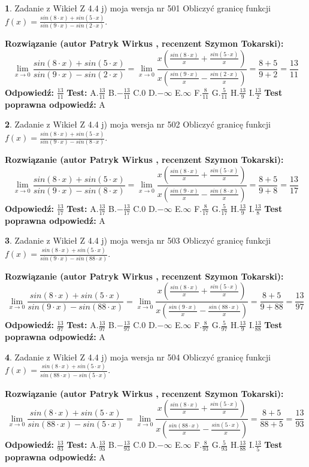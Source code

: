 \documentclass[12pt, a4paper]{article}
\theoremstyle{definition} %
\newtheorem{zad}{}
\newcommand{\zadStart}[1]{\begin{zad}#1\newline}
\newcommand{\zadStop}{\end{zad}}
\newcommand{\rozwStart}[2]{\noindent \textbf{Rozwiązanie (autor #1 , recenzent #2): }\newline}
\newcommand{\rozwStop}{\newline}
\newcommand{\odpStart}{\noindent \textbf{Odpowiedź:}\newline}
\newcommand{\odpStop}{\newline}
\newcommand{\testStart}{\noindent \textbf{Test:}\newline}
\newcommand{\testStop}{\newline}
\newcommand{\kluczStart}{\noindent \textbf{Test poprawna odpowiedź:}\newline}
\newcommand{\kluczStop}{\newline}
\begin{document}
\zadStart{Zadanie z Wikieł Z 4.4 j) moja wersja nr 501}
Obliczyć granicę funkcji $f(x)=\frac{sin(8\cdot x) +sin(5\cdot x)}{sin(9\cdot x) -sin(2\cdot x)}$.
\zadStop
\rozwStart{Patryk Wirkus}{Szymon Tokarski}
$$\lim\limits_{x\to 0}\frac{sin(8\cdot x) +sin(5\cdot x)}{sin(9\cdot x) -sin(2\cdot x)}=\lim\limits_{x\to 0}\frac{x(\frac{sin(8\cdot x)}{x}+\frac{sin(5\cdot x)}{x})}{x(\frac{sin(9\cdot x)}{x}-\frac{sin(2\cdot x)}{x})}=\frac{8+5}{9+2} = \frac{13}{11}$$
\rozwStop
\odpStart
$\frac{13}{11}$
\odpStop
\testStart
A.$\frac{13}{11}$
B.$-\frac{13}{11}$
C.$0$
D.$-\infty$
E.$\infty$
F.$\frac{8}{11}$
G.$\frac{5}{11}$
H.$\frac{13}{9}$
I.$\frac{13}{2}$
\testStop
\kluczStart
A
\kluczStop



\zadStart{Zadanie z Wikieł Z 4.4 j) moja wersja nr 502}
Obliczyć granicę funkcji $f(x)=\frac{sin(8\cdot x) +sin(5\cdot x)}{sin(9\cdot x) -sin(8\cdot x)}$.
\zadStop
\rozwStart{Patryk Wirkus}{Szymon Tokarski}
$$\lim\limits_{x\to 0}\frac{sin(8\cdot x) +sin(5\cdot x)}{sin(9\cdot x) -sin(8\cdot x)}=\lim\limits_{x\to 0}\frac{x(\frac{sin(8\cdot x)}{x}+\frac{sin(5\cdot x)}{x})}{x(\frac{sin(9\cdot x)}{x}-\frac{sin(8\cdot x)}{x})}=\frac{8+5}{9+8} = \frac{13}{17}$$
\rozwStop
\odpStart
$\frac{13}{17}$
\odpStop
\testStart
A.$\frac{13}{17}$
B.$-\frac{13}{17}$
C.$0$
D.$-\infty$
E.$\infty$
F.$\frac{8}{17}$
G.$\frac{5}{17}$
H.$\frac{13}{9}$
I.$\frac{13}{8}$
\testStop
\kluczStart
A
\kluczStop



\zadStart{Zadanie z Wikieł Z 4.4 j) moja wersja nr 503}
Obliczyć granicę funkcji $f(x)=\frac{sin(8\cdot x) +sin(5\cdot x)}{sin(9\cdot x) -sin(88\cdot x)}$.
\zadStop
\rozwStart{Patryk Wirkus}{Szymon Tokarski}
$$\lim\limits_{x\to 0}\frac{sin(8\cdot x) +sin(5\cdot x)}{sin(9\cdot x) -sin(88\cdot x)}=\lim\limits_{x\to 0}\frac{x(\frac{sin(8\cdot x)}{x}+\frac{sin(5\cdot x)}{x})}{x(\frac{sin(9\cdot x)}{x}-\frac{sin(88\cdot x)}{x})}=\frac{8+5}{9+88} = \frac{13}{97}$$
\rozwStop
\odpStart
$\frac{13}{97}$
\odpStop
\testStart
A.$\frac{13}{97}$
B.$-\frac{13}{97}$
C.$0$
D.$-\infty$
E.$\infty$
F.$\frac{8}{97}$
G.$\frac{5}{97}$
H.$\frac{13}{9}$
I.$\frac{13}{88}$
\testStop
\kluczStart
A
\kluczStop



\zadStart{Zadanie z Wikieł Z 4.4 j) moja wersja nr 504}
Obliczyć granicę funkcji $f(x)=\frac{sin(8\cdot x) +sin(5\cdot x)}{sin(88\cdot x) -sin(5\cdot x)}$.
\zadStop
\rozwStart{Patryk Wirkus}{Szymon Tokarski}
$$\lim\limits_{x\to 0}\frac{sin(8\cdot x) +sin(5\cdot x)}{sin(88\cdot x) -sin(5\cdot x)}=\lim\limits_{x\to 0}\frac{x(\frac{sin(8\cdot x)}{x}+\frac{sin(5\cdot x)}{x})}{x(\frac{sin(88\cdot x)}{x}-\frac{sin(5\cdot x)}{x})}=\frac{8+5}{88+5} = \frac{13}{93}$$
\rozwStop
\odpStart
$\frac{13}{93}$
\odpStop
\testStart
A.$\frac{13}{93}$
B.$-\frac{13}{93}$
C.$0$
D.$-\infty$
E.$\infty$
F.$\frac{8}{93}$
G.$\frac{5}{93}$
H.$\frac{13}{88}$
I.$\frac{13}{5}$
\testStop
\kluczStart
A
\kluczStop
\end{document}
